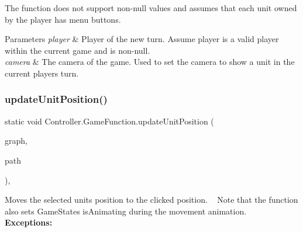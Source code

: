 \begin{DoxyItemize}
\item The function does not support non-\/null values and assumes that each unit owned by the player has menu buttons. 
\begin{DoxyParams}{Parameters}
{\em player} & Player of the new turn. Assume player is a valid player within the current game and is non-\/null. \\
\hline
{\em camera} & The camera of the game. Used to set the camera to show a unit in the current player\textquotesingle{}s turn. \\
\hline
\end{DoxyParams}

\end{DoxyItemize}\hypertarget{class_controller_1_1_game_function_a57eb3ddf64ac935212f80b2c82fa59df}{}\label{class_controller_1_1_game_function_a57eb3ddf64ac935212f80b2c82fa59df} 
\subsubsection{\texorpdfstring{update\+Unit\+Position()}{updateUnitPosition()}}
{\footnotesize\ttfamily static void Controller.\+Game\+Function.\+update\+Unit\+Position (\begin{DoxyParamCaption}\item[{\hyperlink{class_model_1_1_map_module_1_1_graph}{Graph}}]{graph,  }\item[{Linked\+List$<$ \hyperlink{class_model_1_1_map_module_1_1_node}{Node} $>$}]{path }\end{DoxyParamCaption})\hspace{0.3cm}{\ttfamily [inline]}, {\ttfamily [static]}}

Moves the selected unit\textquotesingle{}s position to the clicked position. ~\newline
 Note that the function also sets Game\+State\textquotesingle{}s is\+Animating during the movement animation. ~\newline
~\newline
 {\bfseries Exceptions\+:} ~\newline

